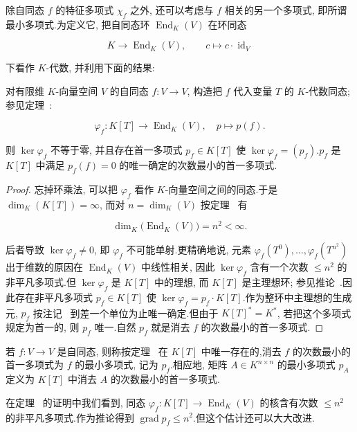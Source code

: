 除自同态 $f$ 的特征多项式 $\chi_f$ 之外, 还可以考虑与 $f$ 相关的另一个多项式, 即所谓最小多项式.为定义它, 把自同态环 $\operatorname{End}_K(V)$ 在环同态

\[
K \longrightarrow \operatorname{End}_K(V), \qquad c \longmapsto c \cdot \operatorname{id}_V\]

下看作 $K$-代数, 并利用下面的结果:

\begin{theorem}\label{thm:6.2.9}
对有限维 $K$-向量空间 $V$ 的自同态 $f \colon V \longrightarrow V$, 构造把 $f$ 代入变量 $T$ 的 $K$-代数同态; 参见定理~:

\[
\varphi_f \colon K[T] \longrightarrow \operatorname{End}_K(V), \quad p \longmapsto p(f)\text{.}\]

则 $\ker \varphi_f$ 不等于零, 并且存在首一多项式 $p_f \in K[T]$ 使 $\ker \varphi_f = (p_f)$.$p_f$ 是 $K[T]$ 中满足 $p_f(f) = 0$ 的唯一确定的次数最小的首一多项式.
\end{theorem}

\begin{proof}
忘掉环乘法, 可以把 $\varphi_f$ 看作 $K$-向量空间之间的同态.于是 $\dim_K(K[T]) = \infty$, 而对 $n = \dim_K(V)$ 按定理~ 有

\[
\dim_K\big(\operatorname{End}_K(V)\big) = n^2 < \infty\text{.}\]

后者导致 $\ker \varphi_f \neq 0$, 即 $\varphi_f$ 不可能单射.更精确地说, 元素 $\varphi_f(T^0), \ldots, \varphi_f(T^{n^2})$ 出于维数的原因在 $\operatorname{End}_K(V)$ 中线性相关, 因此 $\ker \varphi_f$ 含有一个次数 $\leq n^2$ 的非平凡多项式.但 $\ker \varphi_f$ 是 $K[T]$ 中的理想, 而 $K[T]$ 是主理想环; 参见推论~.因此存在非平凡多项式 $p_f \in K[T]$ 使 $\ker \varphi_f = p_f \cdot K[T]$.作为整环中主理想的生成元, $p_f$ 按注记~ 到差一个单位为止唯一确定.但由于 $K[T]^* = K^*$, 若把这个多项式规定为首一的, 则 $p_f$ 唯一.自然 $p_f$ 就是消去 $f$ 的次数最小的首一多项式.
\end{proof}

\begin{definition}[最小多项式]\label{def:6.2.10}
若 $f \colon V \longrightarrow V$ 是自同态, 则称按定理~ 在 $K[T]$ 中唯一存在的,消去 $f$ 的次数最小的首一多项式为 $f$ 的最小多项式, 记为 $p_f$.相应地, 矩阵 $A \in K^{n \times n}$ 的最小多项式 $p_A$ 定义为 $K[T]$ 中消去 $A$ 的次数最小的首一多项式.
\end{definition}

在定理~ 的证明中我们看到, 同态 $\varphi_f \colon K[T] \longrightarrow \operatorname{End}_K(V)$ 的核含有次数 $\leq n^2$ 的非平凡多项式.作为推论得到 $\operatorname{grad} p_f \leq n^2$.但这个估计还可以大大改进.

